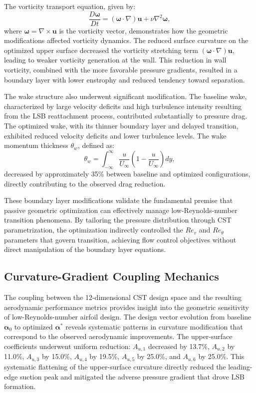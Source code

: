 The vorticity transport equation, given by:
\begin{equation}
\frac{D\boldsymbol{\omega}}{Dt} = (\boldsymbol{\omega} \cdot \nabla)\mathbf{u} + \nu \nabla^2 \boldsymbol{\omega},
\end{equation}
where $\boldsymbol{\omega} = \nabla \times \mathbf{u}$ is the vorticity vector, demonstrates how the geometric modifications affected vorticity dynamics. The reduced surface curvature on the optimized upper surface decreased the vorticity stretching term $(\boldsymbol{\omega} \cdot \nabla)\mathbf{u}$, leading to weaker vorticity generation at the wall. This reduction in wall vorticity, combined with the more favorable pressure gradients, resulted in a boundary layer with lower enstrophy and reduced tendency toward separation.

The wake structure also underwent significant modification. The baseline wake, characterized by large velocity deficits and high turbulence intensity resulting from the LSB reattachment process, contributed substantially to pressure drag. The optimized wake, with its thinner boundary layer and delayed transition, exhibited reduced velocity deficits and lower turbulence levels. The wake momentum thickness $\theta_w$, defined as:
\begin{equation}
\theta_w = \int_{-\infty}^{\infty} \frac{u}{U_\infty}\left(1 - \frac{u}{U_\infty}\right) dy,
\end{equation}
decreased by approximately 35\% between baseline and optimized configurations, directly contributing to the observed drag reduction.

These boundary layer modifications validate the fundamental premise that passive geometric optimization can effectively manage low-Reynolds-number transition phenomena. By tailoring the pressure distribution through CST parametrization, the optimization indirectly controlled the $Re_v$ and $Re_\theta$ parameters that govern transition, achieving flow control objectives without direct manipulation of the boundary layer equations.

\subsection{Curvature-Gradient Coupling Mechanics}

The coupling between the 12-dimensional CST design space and the resulting aerodynamic performance metrics provides insight into the geometric sensitivity of low-Reynolds-number airfoil design. The design vector evolution from baseline $\boldsymbol{\alpha}_0$ to optimized $\boldsymbol{\alpha}^*$ reveals systematic patterns in curvature modification that correspond to the observed aerodynamic improvements. The upper-surface coefficients underwent uniform reduction: $A_{u,1}$ decreased by 13.7\%, $A_{u,2}$ by 11.0\%, $A_{u,3}$ by 15.0\%, $A_{u,4}$ by 19.5\%, $A_{u,5}$ by 25.0\%, and $A_{u,6}$ by 25.0\%. This systematic flattening of the upper-surface curvature directly reduced the leading-edge suction peak and mitigated the adverse pressure gradient that drove LSB formation.

